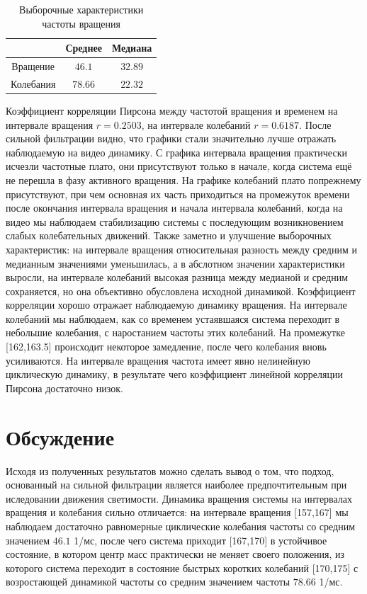 \documentclass[a4paper,12pt]{article} %
\begin{document}
	\begin{table}[H]
		\caption{Выборочные характеристики частоты вращения}
		\label{tab:my_label4}
		\begin{center}
			\vspace{5mm}
			\begin{tabular}{|c|c|c|}
				\hline
				& Среднее & Медиана\\
				\hline
				Вращение & $ 46.1 $ & $ 32.89 $\\
				\hline
				Колебания & $ 78.66 $ & $ 22.32 $\\
				\hline
			\end{tabular}
		\end{center}
	\end{table}
	
	Коэффициент корреляции Пирсона между частотой вращения и временем на интервале вращения $r = 0.2503$, на интервале колебаний $r = 0.6187$.
	\newline После сильной фильтрации видно, что графики стали значительно лучше отражать наблюдаемую на видео динамику. С графика интервала вращения практически исчезли частотные плато, они присутствуют только в начале, когда система ещё не перешла в фазу активного вращения. На графике колебаний плато попрежнему присутствуют, при чем основная их часть приходиться на промежуток времени после окончания интервала вращения и начала интервала колебаний, когда на видео мы наблюдаем стабилизацию системы с последующим возникновением слабых колебательных движений. 
	\newline Также заметно и улучшение выборочных характеристик: на интервале вращения относительная разность между средним и медианным значениями уменьшилась, а в абслотном значении характеристики выросли, на интервале колебаний высокая разница между медианой и средним сохраняется, но она объективно обусловлена исходной динамикой.
	\newline Коэффициент корреляции хорошо отражает наблюдаемую динамику вращения. На интервале колебаний мы наблюдаем, как со временем устаявшаяся система переходит в небольшие колебания, с наростанием частоты этих колебаний. На промежутке [162,163.5] происходит некоторое замедление, после чего колебания вновь усиливаются. На интервале вращения частота имеет явно нелинейную циклическую динамику, в результате чего коэффициент линейной корреляции Пирсона достаточно низок. 
	\section{Обсуждение}
	Исходя из полученных результатов можно сделать вывод о том, что подход, основанный на сильной фильтрации является наиболее предпочтительным при иследовании движения светимости. 
	\newline Динамика вращения системы на интервалах вращения и колебания сильно отличается: на интервале вращения [157,167] мы наблюдаем достаточно равномерные циклические колебания частоты со средним значением $46.1$ 1/мс, после чего система приходит [167,170] в устойчивое состояние, в котором центр масс практически не меняет своего положения, из которого система переходит в состояние быстрых коротких колебаний [170,175] с возростающей динамикой частоты со средним значением частоты $78.66$ 1/мс.
\end{document}
